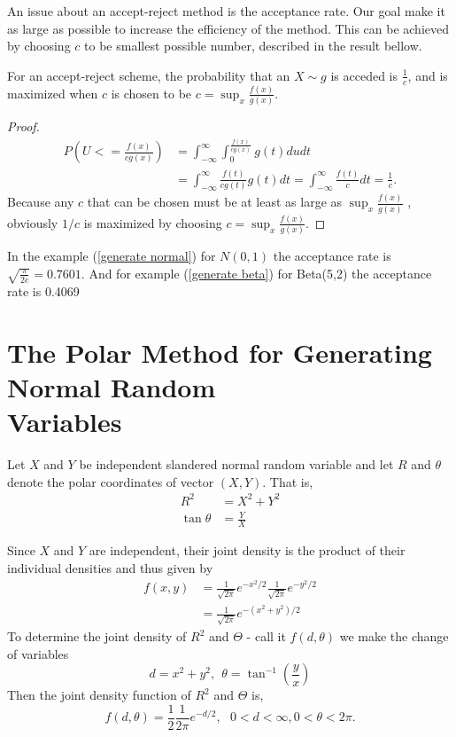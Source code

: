 An issue about an accept-reject method is the acceptance rate. 
Our goal make it as large as possible to increase the efficiency of the method.
This can be achieved by choosing $c$ to be smallest possible number, described in the result bellow.
\begin{theorem}
   For an accept-reject scheme, the probability that an $X\sim g$ is acceded is  $\frac{1}{c}$,
   and is maximized when $c$ is chosen to be $c=\sup_x\frac{f(x)}{g(x)}.$
\end{theorem}
\begin{proof}
   \begin{align*}
       P\left( U<=\frac{f(x)}{cg(x)} \right) &= \int_{-\infty}^{\infty} \int_{0}^{\frac{f(x)}{cg(x)}} g(t) du dt\\
                                             &= \int_{-\infty}^{\infty} \frac{f(t)}{cg(t)}g(t)dt = \int_{-\infty}^{\infty} \frac{f(t)}{c}dt = \frac{1}{c}.
   \end{align*} 
   Because any $c$ that can be chosen must be at least as large as $\sup_x\frac{f(x)}{g(x)}$
   , obviously $1/c$ is maximized by choosing $c=\sup_x\frac{f(x)}{g(x)}.$
\end{proof}

In the example (\ref{generate normal}) for $N(0,1)$ the acceptance rate is $\sqrt{\frac{\pi}{2 e}} = 0.7601$.
And for example (\ref{generate beta}) for Beta(5,2) the acceptance rate is 0.4069

\section{The Polar Method for Generating Normal Random \\ Variables}

Let $X$ and $Y$ be independent slandered normal random variable and let $R$ and $\theta$ 
denote the polar coordinates of vector $(X,Y)$. That is,
\begin{align*}
    R^{2} &= X^{2} + Y^2 \\ 
    \tan \theta &= \frac{Y}{X}
\end{align*}

Since $X$ and $Y$ are independent, their joint density is the product of their individual densities and thus given by
\begin{align*}
    f(x,y) &= \frac{1}{\sqrt{2\pi}} e^{-x^{2}/2 } \frac{1}{\sqrt{2\pi}} e^{-y^{2}/2 }\\ 
           &= \frac{1}{\sqrt{2\pi}} e^{-(x^{2}+y^{2})/2} 
\end{align*}
To determine the joint density of $R^{2} $ and $\Theta$ - call it $f(d,\theta)$ we make the change of variables
\[
    d=x^{2}+y^{2}, \ \  \theta=\tan^{-1}\left( \frac{y}{x} \right)  
\]
Then the joint density function of $R^{2} $ and $\Theta$ is,
\[
    f(d,\theta) = \frac{1}{2}\frac{1}{2\pi} e^{-d/2},\ \ \ 0< d<\infty, 0<\theta<2 \pi. 
\]
